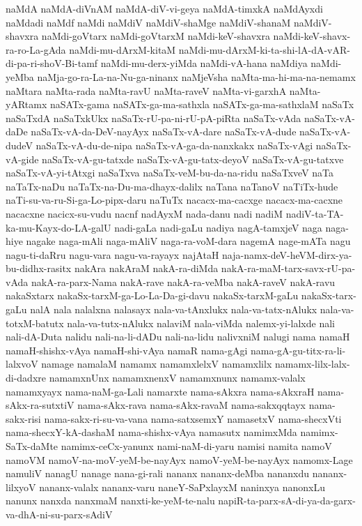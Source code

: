 {naMdA
naMdA-diVnAM
naMdA-diV-vi-geya
naMdA-timxkA
naMdAyxdi
naMdadi
naMdf
naMdi
naMdiV
naMdiV-shaMge
naMdiV-shanaM
naMdiV-shavxra
naMdi-goVtarx
naMdi-goVtarxM
naMdi-keV-shavxra
naMdi-keV-shavx-ra-ro-La-gAda
naMdi-mu-dArxM-kitaM
naMdi-mu-dArxM-ki-ta-shi-lA-dA-vAR-di-pa-ri-shoV-Bi-tamf
naMdi-mu-derx-yiMda
naMdi-vA-hana
naMdiya
naMdi-yeMba
naMja-go-ra-La-na-Nu-ga-ninanx
naMjeVsha
naMta-ma-hi-ma-na-nemamx
naMtara
naMta-rada
naMta-ravU
naMta-raveV
naMta-vi-garxhA
naMta-yARtamx
naSATx-gama
naSATx-ga-ma-sathxla
naSATx-ga-ma-sathxlaM
naSaTx
naSaTxdA
naSaTxkUkx
naSaTx-rU-pa-ni-rU-pA-piRta
naSaTx-vAda
naSaTx-vA-daDe
naSaTx-vA-da-DeV-nayAyx
naSaTx-vA-dare
naSaTx-vA-dude
naSaTx-vA-dudeV
naSaTx-vA-du-de-nipa
naSaTx-vA-ga-da-nanxkakx
naSaTx-vAgi
naSaTx-vA-gide
naSaTx-vA-gu-tatxde
naSaTx-vA-gu-tatx-deyoV
naSaTx-vA-gu-tatxve
naSaTx-vA-yi-tAtxgi
naSaTxva
naSaTx-veM-bu-da-na-ridu
naSaTxveV
naTa
naTaTx-naDu
naTaTx-na-Du-ma-dhayx-dalilx
naTana
naTanoV
naTiTx-hude
naTi-su-va-ru-Si-ga-Lo-pipx-daru
naTuTx
nacacx-ma-cacxge
nacacx-ma-cacxne
nacacxne
nacicx-su-vudu
nacnf
nadAyxM
nada-danu
nadi
nadiM
nadiV-ta-TA-ka-mu-Kayx-do-LA-galU
nadi-gaLa
nadi-gaLu
nadiya
nagA-tamxjeV
naga
naga-hiye
nagake
naga-mAli
naga-mAliV
naga-ra-voM-dara
nagemA
nage-mATa
nagu
nagu-ti-daRru
nagu-vara
nagu-va-rayayx
najAtaH
naja-namx-deV-heVM-dirx-ya-bu-didhx-rasitx
nakAra
nakAraM
nakA-ra-diMda
nakA-ra-maM-tarx-savx-rU-pa-vAda
nakA-ra-parx-Nama
nakA-rave
nakA-ra-veMba
nakA-raveV
nakA-ravu
nakaSxtarx
nakaSx-tarxM-ga-Lo-La-Da-gi-davu
nakaSx-tarxM-gaLu
nakaSx-tarx-gaLu
nalA
nala
nalalxna
nalasayx
nala-va-tAnxlukx
nala-va-tatx-nAlukx
nala-va-totxM-batutx
nala-va-tutx-nAlukx
nalaviM
nala-viMda
nalemx-yi-lalxde
nali
nali-dA-Duta
nalidu
nali-na-li-dADu
nali-na-lidu
nalivxniM
nalugi
nama
namaH
namaH-shishx-vAya
namaH-shi-vAya
namaR
nama-gAgi
nama-gA-gu-titx-ra-li-lalxvoV
namage
namalaM
namamx
namamxlelxV
namamxlilx
namamx-lilx-lalx-di-dadxre
namamxnUnx
namamxnenxV
namamxnunx
namamx-valalx
namamxyayx
nama-naM-ga-Lali
namarxte
nama-sAkxra
nama-sAkxraH
nama-sAkx-ra-sutxtiV
nama-sAkx-rava
nama-sAkx-ravaM
nama-sakxqqtayx
nama-sakx-risi
nama-sakx-ri-su-va-vana
nama-satxsemxY
namasetxV
nama-shecxVti
nama-shecxY-kA-dashaM
nama-shishx-vAya
namasutx
namimxMda
namimx-SaTx-daMte
namimx-ceCx-yanunx
nami-naM-di-yaru
namisi
namita
namoV
namoVM
namoV-na-moV-yeM-be-nayAyx
namoV-yeM-be-nayAyx
namomx-Lage
namuliV
nanagU
nanage
nana-gi-rali
nananx
nananx-deMba
nananxdu
nananx-lilxyoV
nananx-valalx
nananx-varu
naneY-SaPxlayxM
naninxya
nanonxLu
nanunx
nanxda
nanxmaM
nanxti-ke-yeM-te-nalu
napiR-ta-parx-sA-di-ya-da-garx-va-dhA-ni-su-parx-sAdiV
}
